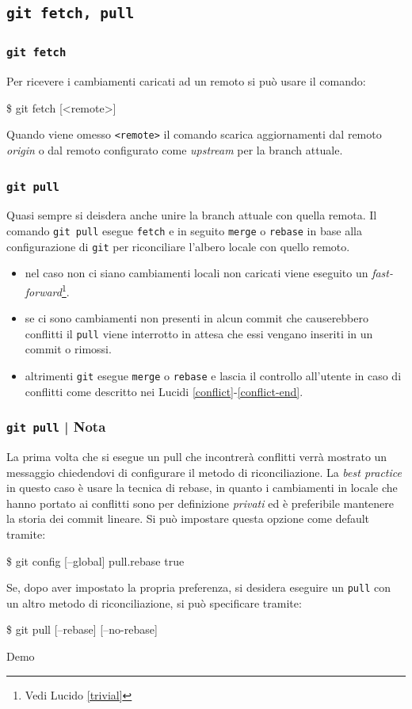 \documentclass{beamer}
\begin{document}
\subsection{\texttt{git fetch, pull}}
\begin{frame}
  \frametitle{\texttt{git fetch}}
  Per ricevere i cambiamenti caricati ad un remoto si pu\`o usare il comando:
  \begin{semiverbatim}
  \$ git fetch [<remote>]
  \end{semiverbatim} \pause
  Quando viene omesso \texttt{<remote>} il comando scarica aggiornamenti dal
  remoto \emph{origin} o dal remoto configurato come \emph{upstream} per la
  branch attuale.
\end{frame}

\begin{frame}
  \frametitle{\texttt{git pull}}
  Quasi sempre si deisdera anche unire la branch attuale con quella remota.
  Il comando \texttt{git pull} esegue \texttt{fetch} e in seguito \texttt{merge}
  o \texttt{rebase} in base alla configurazione di \texttt{git} per riconciliare l'albero
  locale con quello remoto. \\ \pause
  \begin{itemize}
    \item nel caso non ci siano cambiamenti locali non caricati viene eseguito
      un \emph{fast-forward}\footnote{Vedi Lucido \ref{trivial}}.
    \item se ci sono cambiamenti non presenti in alcun commit che causerebbero
      conflitti il \texttt{pull} viene interrotto in attesa che essi vengano
      inseriti in un commit o rimossi.
    \item altrimenti \texttt{git} esegue \texttt{merge} o \texttt{rebase} e lascia il
      controllo all'utente in caso di conflitti come descritto nei
      Lucidi \ref{conflict}-\ref{conflict-end}.
  \end{itemize}
\end{frame}

\begin{frame}
  \frametitle{\texttt{git pull} | Nota}
  La prima volta che si esegue un pull che incontrer\`a conflitti verr\`a
  mostrato un messaggio chiedendovi di configurare il metodo di riconciliazione.
  La \emph{best practice} in questo caso \`e usare la tecnica di rebase, in
  quanto i cambiamenti in locale che hanno portato ai conflitti sono per
  definizione \emph{privati} ed \`e preferibile mantenere la storia dei commit
  lineare. Si pu\`o impostare questa opzione come default tramite:
  \begin{semiverbatim}
  \$ git config [--global] pull.rebase true
  \end{semiverbatim}
  \pause
  Se, dopo aver impostato la propria preferenza, si desidera eseguire un
  \texttt{pull} con un altro metodo di riconciliazione, si pu\`o specificare tramite:
  \begin{semiverbatim}
  \$ git pull [--rebase] [--no-rebase]
  \end{semiverbatim}
\end{frame}

\begin{frame}[c]
  \centering
  Demo
\end{frame}
\end{document}
